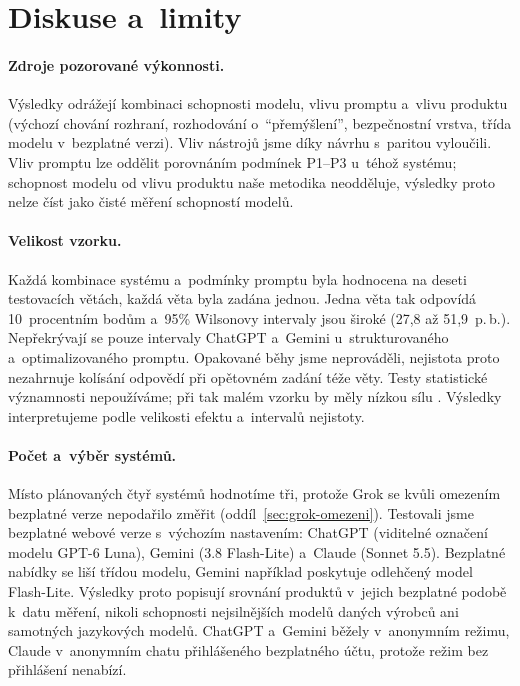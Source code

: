 \documentclass[11pt,a4paper]{article}
\begin{document}
\section{Diskuse a~limity}
\label{sec:limity}

\paragraph{Zdroje pozorované výkonnosti.}
Výsledky odrážejí kombinaci schopnosti modelu, vlivu promptu a~vlivu
produktu (výchozí chování rozhraní, rozhodování o~\enquote{přemýšlení},
bezpečnostní vrstva, třída modelu v~bezplatné verzi). Vliv nástrojů
jsme díky návrhu s~paritou vyloučili. Vliv promptu lze oddělit
porovnáním podmínek P1--P3 u~téhož systému; schopnost modelu od vlivu
produktu naše metodika neodděluje, výsledky proto nelze číst jako
čisté měření schopností modelů.

\paragraph{Velikost vzorku.}
Každá kombinace systému a~podmínky promptu byla hodnocena na deseti
testovacích větách, každá věta byla zadána jednou. Jedna věta tak
odpovídá 10~procentním bodům a~95\% Wilsonovy intervaly jsou široké
(27,8 až 51,9~p.\,b.). Nepřekrývají se pouze intervaly ChatGPT
a~Gemini u~strukturovaného a~optimalizovaného promptu. Opakované běhy
jsme neprováděli, nejistota proto nezahrnuje kolísání odpovědí při
opětovném zadání téže věty. Testy statistické významnosti
nepoužíváme; při tak malém vzorku by měly nízkou sílu
\cite{dror2018,miller2024}. Výsledky interpretujeme podle velikosti
efektu a~intervalů nejistoty.

\paragraph{Počet a~výběr systémů.}
Místo plánovaných čtyř systémů hodnotíme tři, protože Grok se kvůli
omezením bezplatné verze nepodařilo změřit
(oddíl~\ref{sec:grok-omezeni}). Testovali jsme bezplatné webové verze
s~výchozím nastavením: ChatGPT (viditelné označení modelu GPT-6 Luna),
Gemini (3.8 Flash-Lite) a~Claude (Sonnet 5.5). Bezplatné nabídky se
liší třídou modelu, Gemini například poskytuje odlehčený model
Flash-Lite. Výsledky proto popisují srovnání produktů v~jejich
bezplatné podobě k~datu měření, nikoli schopnosti nejsilnějších modelů
daných výrobců ani samotných jazykových modelů. ChatGPT a~Gemini
běžely v~anonymním režimu, Claude v~anonymním chatu přihlášeného
bezplatného účtu, protože režim bez přihlášení nenabízí.
\end{document}

